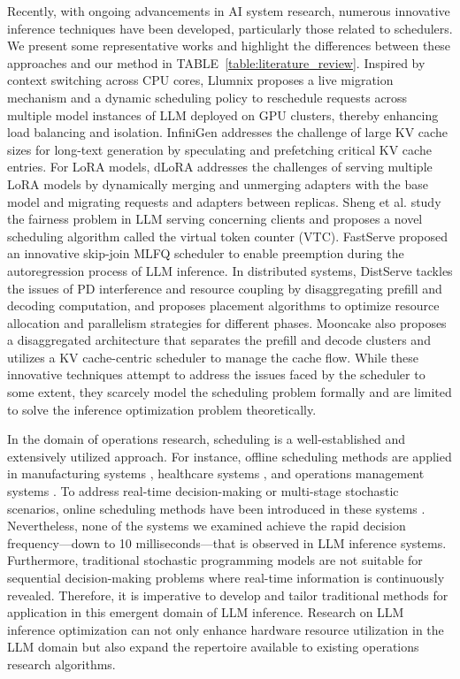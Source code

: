 Recently, with ongoing advancements in AI system research, numerous innovative inference techniques have been developed, particularly those related to schedulers. We present some representative works and highlight the differences between these approaches and our method in TABLE~\ref{table:literature_review}. Inspired by context switching across CPU cores, Llumnix \cite{sun2024llumnix} proposes a live migration mechanism and a dynamic scheduling policy to reschedule requests across multiple model instances of LLM deployed on GPU clusters, thereby enhancing load balancing and isolation. InfiniGen \cite{lee2024infinigen} addresses the challenge of large KV cache sizes for long-text generation by speculating and prefetching critical KV cache entries. For LoRA models, dLoRA \cite{wu2024dlora} addresses the challenges of serving multiple LoRA models by dynamically merging and unmerging adapters with the base model and migrating requests and adapters between replicas. Sheng et al. \cite{sheng2024fairness} study the fairness problem in LLM serving concerning clients and proposes a novel scheduling algorithm called the virtual token counter (VTC). FastServe \cite{wu2023fast} proposed an innovative skip-join MLFQ scheduler to enable preemption during the autoregression process of LLM inference. In distributed systems, DistServe \cite{zhong2024distserve} tackles the issues of PD interference and resource coupling by disaggregating prefill and decoding computation, and proposes placement algorithms to optimize resource allocation and parallelism strategies for different phases. Mooncake \cite{qin2024mooncake} also proposes a disaggregated architecture that separates the prefill and decode clusters and utilizes a KV cache-centric scheduler to manage the cache flow. While these innovative techniques attempt to address the issues faced by the scheduler to some extent, they scarcely model the scheduling problem formally and are limited to solve the inference optimization problem theoretically.


In the domain of operations research, scheduling is a well-established and extensively utilized approach. For instance, offline scheduling methods are applied in manufacturing systems \cite{wang2020print3D}, healthcare systems \cite{pang2018surgery}, and operations management systems \cite{erdogan2015online}. To address real-time decision-making or multi-stage stochastic scenarios, online scheduling methods have been introduced in these systems \cite{pang2022dynamic, lee2019online}. Nevertheless, none of the systems we examined achieve the rapid decision frequency—down to 10 milliseconds—that is observed in LLM inference systems. Furthermore, traditional stochastic programming models are not suitable for sequential decision-making problems where real-time information is continuously revealed. Therefore, it is imperative to develop and tailor traditional methods for application in this emergent domain of LLM inference. Research on LLM inference optimization can not only enhance hardware resource utilization in the LLM domain but also expand the repertoire available to existing operations research algorithms.


